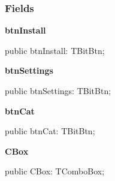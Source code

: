 \documentclass{report}
\newif\ifpdf
\begin{document}
\subsubsection*{\large{\textbf{Fields}}\normalsize\hspace{1ex}\hfill}
\begin{list}{}{
\setlength{\itemindent}{0cm}
\setlength{\listparindent}{0cm}
\setlength{\leftmargin}{\evensidemargin}
\addtolength{\leftmargin}{\tmplength}
\settowidth{\labelsep}{X}
\addtolength{\leftmargin}{\labelsep}
\setlength{\labelwidth}{\tmplength}
}
\label{manager.TMnFrm-btnInstall}
\item[\textbf{btnInstall}\hfill]
\ifpdf
\begin{flushleft}
\fi
\begin{ttfamily}
public btnInstall: TBitBtn;\end{ttfamily}

\ifpdf
\end{flushleft}
\fi


\par  \label{manager.TMnFrm-btnSettings}
\item[\textbf{btnSettings}\hfill]
\ifpdf
\begin{flushleft}
\fi
\begin{ttfamily}
public btnSettings: TBitBtn;\end{ttfamily}

\ifpdf
\end{flushleft}
\fi


\par  \label{manager.TMnFrm-btnCat}
\item[\textbf{btnCat}\hfill]
\ifpdf
\begin{flushleft}
\fi
\begin{ttfamily}
public btnCat: TBitBtn;\end{ttfamily}

\ifpdf
\end{flushleft}
\fi


\par  \label{manager.TMnFrm-CBox}
\item[\textbf{CBox}\hfill]
\ifpdf
\begin{flushleft}
\fi
\begin{ttfamily}
public CBox: TComboBox;\end{ttfamily}

\ifpdf
\end{flushleft}
\fi



\end{list}
\end{document}
